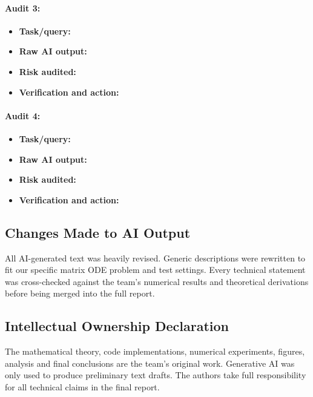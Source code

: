 \paragraph{Audit 3:}
\begin{itemize}[leftmargin=1.5em, itemsep=2pt]
    \item \textbf{Task/query:}
    \item \textbf{Raw AI output:}
    \item \textbf{Risk audited:}
    \item \textbf{Verification and action:}
\end{itemize}

\paragraph{Audit 4:}
\begin{itemize}[leftmargin=1.5em, itemsep=2pt]
    \item \textbf{Task/query:}
    \item \textbf{Raw AI output:}
    \item \textbf{Risk audited:}
    \item \textbf{Verification and action:}
\end{itemize}

\subsection*{Changes Made to AI Output}
All AI-generated text was heavily revised. Generic descriptions were rewritten to fit our specific matrix ODE problem and test settings. Every technical statement was cross-checked against the team’s numerical results and theoretical derivations before being merged into the full report.

\subsection*{Intellectual Ownership Declaration}
The mathematical theory, code implementations, numerical experiments, figures, analysis and final conclusions are the team’s original work. Generative AI was only used to produce preliminary text drafts. The authors take full responsibility for all technical claims in the final report.
